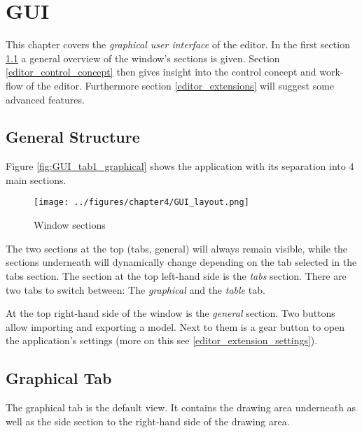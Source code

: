 \documentclass[twoside, openright, 12pt]{book}
\begin{document}
\section{GUI}
\label{editor_gui}
This chapter covers the \textit{graphical user interface} of the editor.
In the first section \ref{editor_structure} a general overview of the window's sections is given.
Section \ref{editor_control_concept} then gives insight into the control concept and work-flow of the editor.
Furthermore section \ref{editor_extensions} will suggest some advanced features.



\subsection{General Structure}
\label{editor_structure}
Figure \ref{fig:GUI_tab1_graphical} shows the application with its separation into 4 main sections.

\begin{figure}[htb]
	\centering
	\texttt{[image: ../figures/chapter4/GUI\_layout.png]}
	\caption{Window sections}
	\label{fig:GUI_layout}
\end{figure}

\noindent
The two sections at the top (tabs, general) will always remain visible, while the sections underneath will dynamically change depending on the tab selected in the tabs section.
The section at the top left-hand side is the \textit{tabs} section.
There are two tabs to switch between: The \textit{graphical} and the \textit{table} tab.

At the top right-hand side of the window is the \textit{general} section.
Two buttons allow importing and exporting a model.
Next to them is a gear button to open the application's settings (more on this see \ref{editor_extension_settings}).



\subsection{Graphical Tab}
\label{editor_graphical}
The graphical tab is the default view.
It contains the drawing area underneath as well as the side section to the right-hand side of the drawing area.
\end{document}
